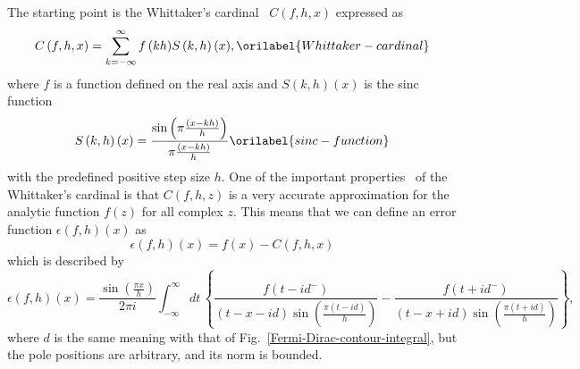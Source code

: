 \documentclass[aps,showkeys,noshowpacs,superscriptaddress,pre,preprint]{revtex4-2}
\let\label\orilabel
\begin{document}
The starting point is the Whittaker's cardinal~\cite{Whittaker1915,Whittaker1927}
${C \left( f, h, x \right)}$ expressed as
\begin{equation}
{C \left( f, h, x \right)} = \sum_{k = - \infty}^{\infty} {f \left( k h \right)} {S \left( k, h \right) \left( x \right)} ,
\label{Whittaker-cardinal}
\end{equation}
where $f$ is a function defined on the real axis and ${S \left( k, h \right) \left( x \right)}$ is the sinc function
\begin{equation}
{S \left( k, h \right) \left( x \right)} = \frac{\sin \left( \pi \frac{\left( x - k h \right)}{h} \right)}{\pi \frac{\left( x - k h \right)}{h}} 
\label{sinc-function}
\end{equation}
with the predefined positive step size $h$.
One of the important properties~\cite{Stenger1976} of the Whittaker's cardinal  is that 
${C \left( f, h, z \right)}$ is a very accurate approximation for
the analytic function $f (z)$ for all complex $z$.
This means that we can define an error function ${\epsilon (f, h) (x)}$ as
\begin{equation*}
{\epsilon (f, h) (x)} = f(x) - C(f, h, x) 
\end{equation*}
which is described by
\begin{equation*}
{\epsilon (f, h) (x)} = \frac{\sin\left( \frac{\pi x }{h} \right)}{2 \pi i} \int_{-\infty}^{\infty} dt \,
\left\{
\frac{f\left( t - i d^- \right)}{\left( t - x - i d \right) \sin\left( \frac{\pi \left( t - i d \right)}{h} \right) }
-
\frac{f\left( t + i d^- \right)}{\left( t - x + i d \right) \sin\left( \frac{\pi \left( t + i d \right)}{h} \right) }
\right\} ,
\end{equation*}
where $d$ is the same meaning with that of Fig.~\ref{Fermi-Dirac-contour-integral},
but the pole positions are arbitrary,
and its norm is bounded.
\end{document}
